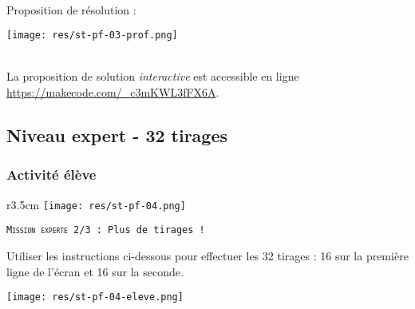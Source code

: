 \newpage

\begin{minipage}[t]{0.8\linewidth}
    \begin{methode}~\\
        Proposition de résolution :
        
        \centerline{
            \texttt{[image: res/st-pf-03-prof.png]}}
    \end{methode}
\end{minipage}
\hfill
\begin{minipage}[t]{0.2\linewidth}
    \begin{remarque}~\\
    La proposition de solution \emph{interactive} est accessible en ligne \url{https://makecode.com/_c3mKWL3fFX6A}.
\end{remarque}
\end{minipage}





%
%
\newpage
\subsection{Niveau expert - 32 tirages}
\subsubsection{Activité élève}



%
%
\begin{wrapfigure}[4]{r}{3.5cm}
    \texttt{[image: res/st-pf-04.png]}
\end{wrapfigure}

\begin{eleve}	
	\texttt{\textsc{Mission experte 2/3} : Plus de tirages !}
	
	Utiliser les instructions ci-dessous pour effectuer les 32 tirages : 16 sur la première ligne de l'écran et 16 sur la seconde.
	
    \centerline{\texttt{[image: res/st-pf-04-eleve.png]}}
\end{eleve}

\newpage

